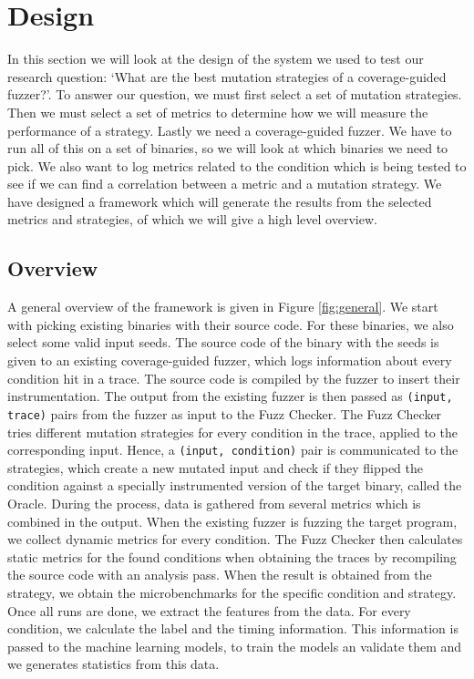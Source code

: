 
\chapter{Design}\label{chap:methology} %
In this section we will look at the design of the system we used to test our research question: `What are the best mutation strategies of a coverage-guided fuzzer?'. To answer our question, we must first select a set of mutation strategies. Then we must select a set of metrics to determine how we will measure the performance of a strategy. Lastly we need a coverage-guided fuzzer. We have to run all of this on a set of binaries, so we will look at which binaries we need to pick. We also want to log metrics related to the condition which is being tested to see if we can find a correlation between a metric and a mutation strategy. We have designed a framework which will generate the results from the selected metrics and strategies, of which we will give a high level overview.

\section{Overview}\label{sec:overview}
A general overview of the framework is given in Figure \ref{fig:general}. We start with picking existing binaries with their source code. For these binaries, we also select some valid input seeds. The source code of the binary with the seeds is given to an existing coverage-guided fuzzer, which logs information about every condition hit in a trace. The source code is compiled by the fuzzer to insert their instrumentation. The output from the existing fuzzer is then passed as \texttt{(input, trace)} pairs from the fuzzer as input to the Fuzz Checker. The Fuzz Checker tries different mutation strategies for every condition in the trace, applied to the corresponding input. Hence, a \texttt{(input, condition)} pair is communicated to the strategies, which create a new mutated input and check if they flipped the condition against a specially instrumented version of the target binary, called the Oracle. 
During the process, data is gathered from several metrics which is combined in the output.
When the existing fuzzer is fuzzing the target program, we collect dynamic metrics for every condition.
The Fuzz Checker then calculates static metrics for the found conditions when obtaining the traces by recompiling the source code with an analysis pass.
When the result is obtained from the strategy, we obtain the microbenchmarks for the specific condition and strategy.
Once all runs are done, we extract the features from the data. For every condition, we calculate the label and the timing information. This information is passed to the machine learning models, to train the models an validate them and we generates statistics from this data.



